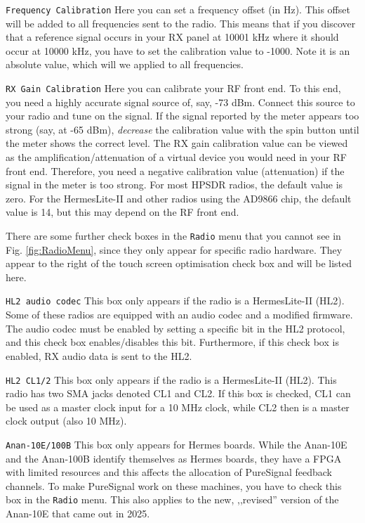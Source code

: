 \documentclass[12pt]{book}
\def\rett#1{\texttt{\color{red}#1}}
\def\bltt#1{\texttt{\color{blue}#1}}
\begin{document}
\rett{Frequency Calibration} Here you can set a frequency offset (in Hz). This offset
will be added to all frequencies sent to the radio. This means that if you discover that
a reference signal occurs in your RX panel at 10001 kHz where it should occur at 10000
kHz, you have to set the calibration value to -1000. Note it is an absolute value,
which will we applied to all frequencies.

\rett{RX Gain Calibration} Here you can calibrate your RF front end. To this end, you
need a highly accurate signal source of, say, -73 dBm. Connect this source to your
radio and tune on the signal. If the signal reported by the meter
appears too strong (say, at -65 dBm),
\textit{decrease} the
calibration value with the spin button until the meter shows the correct level.
The RX gain calibration value can be viewed as the  amplification/attenuation of
a virtual device you
would need in your RF front end. Therefore, you need a negative calibration value (attenuation)
if the signal in the meter is too strong. For most HPSDR radios, the default value is
zero. For the HermesLite-II and other radios using the AD9866 chip, the default
value is 14, but this may depend on the RF front end.

There are some further check boxes in the \bltt{Radio} menu that you cannot see
in Fig. \ref{fig:RadioMenu}, since they only appear for specific radio hardware.
They appear to the right of the touch screen optimisation check box
and will be listed here.

\rett{HL2 audio codec} This box only appears if the radio is a HermesLite-II (HL2). Some
of these radios are equipped with an audio codec and a modified firmware. The
audio codec must be enabled by setting a specific bit in the HL2 protocol,
and this check box enables/disables this bit. Furthermore, if this check box
is enabled, RX audio data is sent to the HL2.

\rett{HL2 CL1/2} This box only appears if the radio is a HermesLite-II (HL2). This
radio has two SMA jacks denoted CL1 and CL2. If this box is checked, CL1 can be
used as a master clock input for a 10 MHz clock, while CL2 then is a master
clock output (also 10 MHz).

\rett{Anan-10E/100B} This box only appears for Hermes boards. While the Anan-10E and
the Anan-100B identify themselves as Hermes boards, they have a FPGA with limited
resources and this affects the allocation of PureSignal feedback channels. To make
PureSignal work on these machines, you have to check this box in the \bltt{Radio} menu.
This also applies to the new, ,,revised'' version of the Anan-10E that came out
in 2025.
\end{document}
